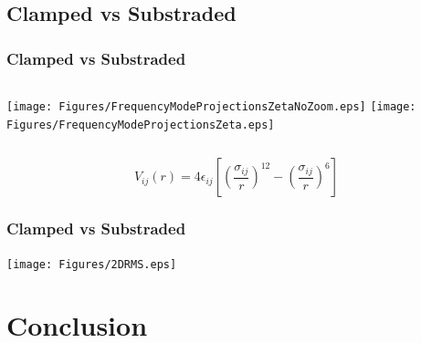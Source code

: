 \documentclass[hyperref={colorlinks=true,urlcolor=blue,linkcolor=.},aspectratio=1610,mathserif]{beamer}
\begin{document}
\subsection{Clamped vs Substraded}

\begin{frame}
 \frametitle{Clamped vs Substraded}
 \begin{columns}[T]
  \texttt{[image: Figures/FrequencyModeProjectionsZetaNoZoom.eps]}
  \texttt{[image: Figures/FrequencyModeProjectionsZeta.eps]}
 \end{columns}
 \begin{equation}
  V_{ij}(r) = 4 \epsilon_{ij} \left[ \left( \frac{\sigma_{ij}}{r} \right) ^{12} - \left( \frac{\sigma_{ij}}{r} \right) ^6 \right] \nonumber
 \end{equation}
\end{frame}

\begin{frame}
 \frametitle{Clamped vs Substraded}
 \begin{center}
  \texttt{[image: Figures/2DRMS.eps]}
 \end{center}
\end{frame}

\section{Conclusion}
\end{document}
